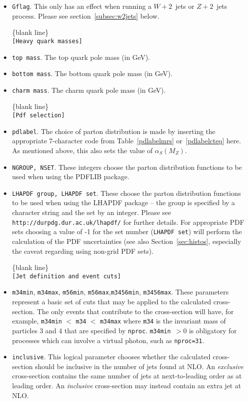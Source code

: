 \documentclass[12pt]{article}
\begin{document}
\begin{itemize}
\item {\tt Gflag}. This only has an effect when running a
$W+2$~jets or $Z+2$~jets process. Please see section~\ref{subsec:w2jets}
below.

\begin{center}
\{blank line\} \\
{\tt [Heavy quark masses] }
\end{center}
\item {\tt top mass}. The top quark pole mass (in GeV).
\item {\tt bottom mass}. The bottom quark pole mass (in GeV).
\item {\tt charm mass}. The charm quark pole mass (in GeV).

\begin{center}
\{blank line\} \\
{\tt [Pdf selection] }
\end{center}

\item {\tt pdlabel}. The choice of parton distribution is made by
inserting the appropriate 7-character code from Table~\ref{pdlabelmrs}
or~\ref{pdlabelcteq} here.
As mentioned above, this also sets the value of $\alpha_S(M_Z)$.

\item {\tt NGROUP, NSET}. These integers choose the parton distribution
functions to be used when using the PDFLIB package.
\item {\tt LHAPDF group, LHAPDF set}. These choose the parton
distribution functions to be used when using the LHAPDF package --
the group is specified by a character string and the set by an integer.
Please see {\tt http://durpdg.dur.ac.uk/lhapdf/} for further details.
For appropriate PDF sets choosing a value of -1 for the set number ({\tt  LHAPDF set}) 
will perform the calculation of the PDF uncertainties (see also
Section~\ref{sec:histos}, especially the caveat regarding using
non-grid PDF sets).

\begin{center}
\{blank line\} \\
{\tt [Jet definition and event cuts] }
\end{center}

\item {\tt m34min}, {\tt m34max}, {\tt m56min}, {\tt m56max},{\tt m3456min}, {\tt m3456max}.
These parameters represent a basic set of cuts that may be applied
to the calculated cross-section. The only events that contribute to
the cross-section will have, for example,
{\tt m34min} $<$ {\tt m34} $<$ {\tt m34max} where {\tt m34} is the
invariant mass of particles 3 and 4 that are specified by {\tt nproc}.
{\tt m34min}~$> 0$ is obligatory for processes which can involve a virtual
photon, such as {\tt nproc=31}.
\item {\tt inclusive}.  This logical parameter chooses whether the
calculated cross-section should be inclusive in the number of jets
found at NLO. An {\em exclusive}
cross-section contains the same number of jets at next-to-leading
order as at leading order. An {\em inclusive} cross-section may
instead contain an extra jet at NLO.


\end{itemize}
\end{document}
